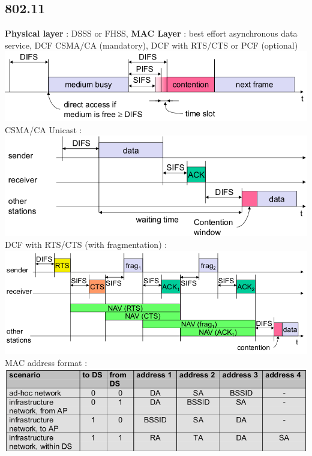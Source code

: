 \documentclass[6pt]{scrartcl}
\begin{document}
\begin{multicols}{4}
\subsection{802.11}
\textbf{Physical layer} : DSSS or FHSS,
\textbf{MAC Layer} : best effort asynchronous data service, DCF CSMA/CA (mandatory), DCF with RTS/CTS or PCF (optional)
\includegraphics[width=\columnwidth]{B1}
CSMA/CA Unicast : \\
\includegraphics[width=\columnwidth]{B12}
DCF with RTS/CTS (with fragmentation) : \\
\includegraphics[width=\columnwidth]{B14}
MAC address format : \\
\includegraphics[width=\columnwidth]{B15}

\end{multicols}
\end{document}
